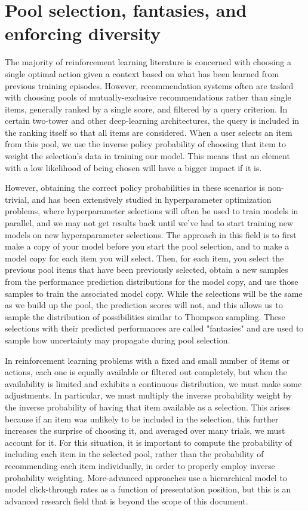 \documentclass{article}
\begin{document}
\section{Pool selection, fantasies, and enforcing diversity}

The majority of reinforcement learning literature is concerned with choosing a single optimal action given a context based on what has been learned from previous training episodes. However, recommendation systems often are tasked with choosing pools of mutually-exclusive recommendations rather than single items, generally ranked by a single score, and filtered by a query criterion. In certain two-tower and other deep-learning architectures, the query is included in the ranking itself so that all items are considered. When a user selects an item from this pool, we use the inverse policy probability of choosing that item to weight the selection's data in training our model. This means that an element with a low likelihood of being chosen will have a bigger impact if it is.

However, obtaining the correct policy probabilities in these scenarios is non-trivial, and has been extensively studied in hyperparameter optimization problems\cite{parallel_hyperparameter_tuning,parallel_hyperparameter_tuning2}, where hyperparameter selections will often be used to train models in parallel, and we may not get results back until we've had to start training new models on new hyperaparameter selections. The approach in this field is to first make a copy of your model before you start the pool selection, and to make a model copy for each item you will select. Then, for each item, you select the previous pool items that have been previously selected, obtain a new samples from the performance prediction distributions for the model copy, and use those samples to train the associated model copy. While the selections will be the same as we build up the pool, the prediction scores will not, and this allows us to sample the distribution of possibilities similar to Thompson sampling. These selections with their predicted performances are called "fantasies" and are used to sample how uncertainty may propagate during pool selection.

In reinforcement learning problems with a fixed and small number of items or actions, each one is equally available or filtered out completely, but when the availability is limited and exhibits a continuous distribution, we must make some adjustments. In particular, we must multiply the inverse probability weight by the inverse probability of having that item available as a selection. This arises because if an item was unlikely to be included in the selection, this further increases the surprise of choosing it, and averaged over many trials, we must account for it. For this situation, it is important to compute the probability of including each item in the selected pool, rather than the probability of recommending each item individually, in order to properly employ inverse probability weighting.  More-advanced approaches use a hierarchical model to model click-through rates as a function of presentation position\cite{zappella_position_based}, but this is an advanced research field that is beyond the scope of this document.
\end{document}
